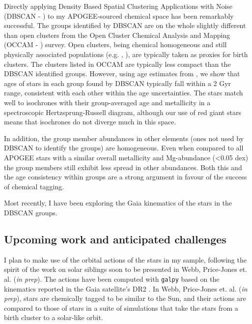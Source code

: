 \documentclass[11pt]{article}
\begin{document}
Directly applying Density Based Spatial Clustering Applications with Noise (DBSCAN - \citealt{Ester1996}) to my APOGEE-sourced chemical space has been remarkably successful. The groups identified by DBSCAN are on the whole slightly different than open clusters from the Open Cluster Chemical Analysis and Mapping	(OCCAM - \citealt{Frinchaboy2003}) survey. Open clusters, being chemical homogeneous and still physically associated populations (e.g. \citealt{DeSilva2006}, \citealt{Bovy2016}), are typically taken as proxies for birth clusters. The clusters listed in OCCAM are typically less compact than the DBSCAN identified groups. However, using age estimates from \citet{Mackereth2019}, we show that ages of stars in each group found by DBSCAN typically fall within a 2 Gyr range, consistent with each other within the age uncertainties. The stars match well to isochrones with their group-averaged age and metallicity in a spectroscopic Hertzsprung-Russell diagram, although our use of red giant stars means that isochrones do not diverge much in this space.

In addition, the group member abundances in other elements (ones not used by DBSCAN to identify the groups) are homogeneous. Even when compared to all APOGEE stars with a similar overall metallicity and Mg-abundance (<0.05 dex) the group members still exhibit less spread in other abundances. Both this and the age consistency within groups are a strong argument in favour of the success of chemical tagging.

Most recently, I have been exploring the Gaia \citep{GaiaCollaboration2016} kinematics of the stars in the DBSCAN groups.
    
    \subsection*{Upcoming work and anticipated challenges}
    
    I plan to make use of the orbital actions of the stars in my sample, following the spirit of the work on solar siblings soon to be presented in Webb, Price-Jones et. al. (\emph{in prep}). The actions have been computed with \texttt{galpy} \citep{Bovy2015} based on the kinematics reported in the Gaia satellite's DR2 \citep{GaiaCollaboration2016}. In Webb, Price-Jones et. al. (\emph{in prep}), stars are chemically tagged to be similar to the Sun, and their actions are compared to those of stars in a suite of simulations that take the stars from a birth cluster to a solar-like orbit. 
    
\end{document}
